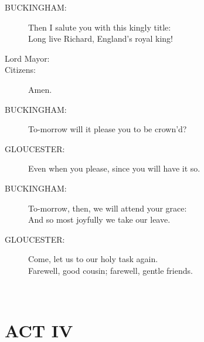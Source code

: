 \documentclass{article}
\begin{document}
\begin{description}
\item[BUCKINGHAM:] 
\hspace{1pt}Then I salute you with this kingly title:\\
\hspace{1pt}Long live Richard, England's royal king!\\
\end{description}
\begin{description}
\item[Lord Mayor:] 
\item[Citizens:] 
\hspace{1pt}Amen.\\
\end{description}
\begin{description}
\item[BUCKINGHAM:] 
\hspace{1pt}To-morrow will it please you to be crown'd?\\
\end{description}
\begin{description}
\item[GLOUCESTER:] 
\hspace{1pt}Even when you please, since you will have it so.\\
\end{description}
\begin{description}
\item[BUCKINGHAM:] 
\hspace{1pt}To-morrow, then, we will attend your grace:\\
\hspace{1pt}And so most joyfully we take our leave.\\
\end{description}
\begin{description}
\item[GLOUCESTER:] 
\hspace{1pt}Come, let us to our holy task again.\\
\hspace{1pt}Farewell, good cousin; farewell, gentle friends.\\
\end{description}
\centering{\it [Exeunt]}\\
\section*{ACT IV}
\end{document}
